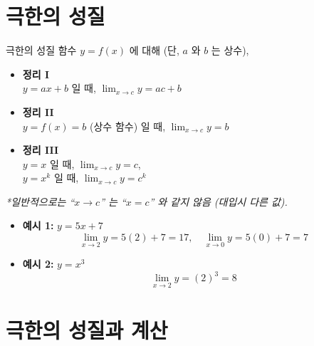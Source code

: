 \documentclass[aspectratio=169]{beamer}
\begin{document}
\section{극한의 성질}
\begin{frame}{극한의 성질}
  함수 \( y = f(x) \) 에 대해 (단, \( a \) 와 \( b \) 는 상수),
  \begin{itemize}
    \item \textbf{정리 I}  \\
    \( y = ax + b \) 일 때,  
    \( \lim_{x \to c} y = ac + b \)  
    
    \item \textbf{정리 II}  \\
    \( y = f(x) = b \) (상수 함수) 일 때,  
    \( \lim_{x \to c} y = b \)  

    \item \textbf{정리 III}  \\
    \( y = x \) 일 때, \( \lim_{x \to c} y = c \),   \\
    \( y = x^k \) 일 때, \( \lim_{x \to c} y = c^k \)  
  \end{itemize}
  \emph{*일반적으로는 “\( x \to c \)” 는 “\( x = c \)” 와 같지 않음 (대입시 다른 값).}


  \begin{itemize}
    \item \textbf{예시 1:} \( y = 5x + 7 \)  
    \[
      \lim_{x \to 2} y = 5(2) + 7 = 17,\quad
      \lim_{x \to 0} y = 5(0) + 7 = 7
    \]

    \item \textbf{예시 2:} \( y = x^3 \)  
    \[
      \lim_{x \to 2} y = (2)^3 = 8
    \]
  \end{itemize}
\end{frame}




\section{극한의 성질과 계산}
\end{document}
